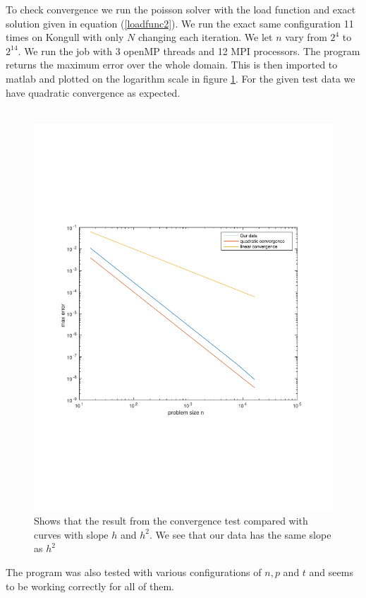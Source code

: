 To check convergence we run the poisson solver with the load function and exact solution given in equation (\ref{loadfunc2}). We run the exact same configuration 11 times on Kongull with only $N$ changing each iteration. We let $n$ vary from $2^4$ to $2^{14}$. We run the job with 3 openMP threads and 12 MPI processors. The program returns the maximum error over the whole domain. This is then imported to matlab and plotted on the logarithm scale in figure \ref{fig:checkConv}. For the given test data we have quadratic convergence as expected.\\
\\
\begin{figure}[h]
\centering
\includegraphics[width=0.6\linewidth]{./figures/checkConv}
\caption{Shows that the result from the convergence test compared with curves with slope $h$ and $h^2$. We see that our data has the same slope as $h^2$}
\label{fig:checkConv}
\end{figure}
The program was also tested with various configurations of $n, p$ and $t$ and seems to be working correctly for all of them.
